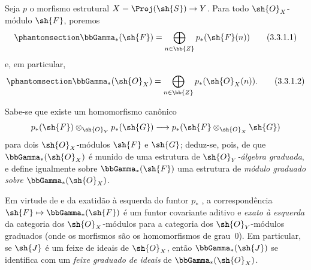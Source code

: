\documentclass[oneside,10pt]{amsart}
\makeatletter
\newcommand{\ega@arrow}[2]{\mathchoice{#1}{#2}{#2}{#2}}
\let\ega@shortmapsto\mapsto
\renewcommand{\to}{\ega@arrow{\longrightarrow}{\rightarrow}}
\renewcommand{\mapsto}{\ega@arrow{\longmapsto}{\ega@shortmapsto}}
\newcommand{\oldpage}[2][]{\marginnote{\normalfont\footnotesize\textbf{#1}~|~#2}\ignorespaces}
\let\EGAOriginalLabel\label
\renewcommand{\label}[1]{\phantomsection\EGAOriginalLabel{#1}}
\makeatother
\begin{document}
\begin{env}[3.3.1]
\label{II.3.3.1}
Seja $p$ o morfismo estrutural $X=\Proj(\sh{S})\to Y$.
Para todo $\sh{O}_X$-módulo $\sh{F}$, poremos
\[
\label{II.3.3.1.1}
  \bbGamma_*(\sh{F})=\bigoplus_{n\in\bb{Z}}p_*(\sh{F}(n))
\tag{3.3.1.1}
\]
\oldpage[II]{57}
e, em particular,
\[
\label{II.3.3.1.2}
  \bbGamma_*(\sh{O}_X)=\bigoplus_{n\in\bb{Z}}p_*(\sh{O}_X(n)).
\tag{3.3.1.2}
\]

Sabe-se  que existe um homomorfismo canônico
\[
  p_*(\sh{F})\otimes_{\sh{O}_Y}p_*(\sh{G})\to p_*(\sh{F}\otimes_{\sh{O}_X}\sh{G})
\]
para dois $\sh{O}_X$-módulos $\sh{F}$ e $\sh{G}$;
deduz-se, pois, de  que $\bbGamma_*(\sh{O}_X)$ é munido de uma estrutura de \emph{$\sh{O}_Y$-álgebra graduada}, e  define igualmente sobre $\bbGamma_*(\sh{F})$ uma estrutura de \emph{módulo graduado sobre $\bbGamma_*(\sh{O}_X)$}.

Em virtude de  e da exatidão à esquerda do funtor $p_*$ , a correspondência $\sh{F}\mapsto\bbGamma_*(\sh{F})$ é um funtor covariante aditivo e \emph{exato à esquerda} da categoria dos $\sh{O}_X$-módulos para a categoria dos $\sh{O}_Y$-módulos graduados (onde os morfismos são os homomorfismos de grau~$0$).
Em particular, se $\sh{J}$ é um feixe de ideais de $\sh{O}_X$, então $\bbGamma_*(\sh{J})$ se identifica com um \emph{feixe graduado de ideais} de $\bbGamma_*(\sh{O}_X)$.
\end{env}
\end{document}
